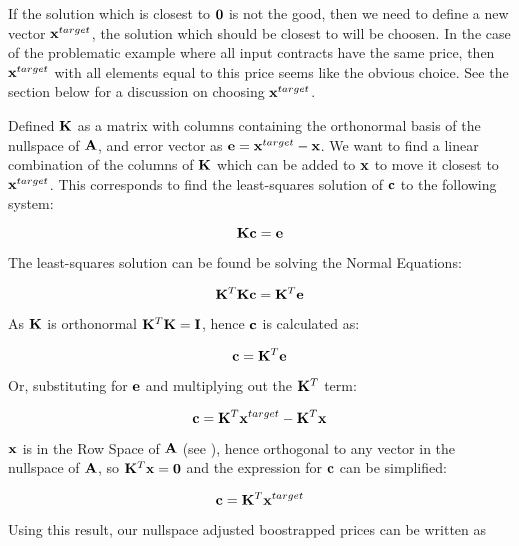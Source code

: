 \documentclass{article}
\begin{document}
\bigskip

If the solution which is closest to $\mathbf{0}$ is not the good, then we need to define
a new vector $\mathbf{x}^{target}$, the solution which should be closest to will be choosen.
In the case of the problematic example where all input contracts have the same price,
then $\mathbf{x}^{target}$ with all elements equal to this price seems like the obvious choice.
See the section below for a discussion on choosing $\mathbf{x}^{target}$.

\bigskip

Defined $\mathbf{K}$ as a matrix with columns containing the orthonormal basis of the nullspace
of $\mathbf{A}$, and error vector as $\mathbf{e} = \mathbf{x}^{target} - \mathbf{x}$. We want to find a linear combination
of the columns of $\mathbf{K}$ which can be added to $\mathbf{x}$ to move it closest to $\mathbf{x}^{target}$.
This corresponds to find the least-squares solution of $\mathbf{c}$ to the following system:

\begin{equation}
    \mathbf{K}\mathbf{c} = \mathbf{e}
\end{equation}

The least-squares solution can be found be solving the Normal Equations:

\begin{equation}
    \mathbf{K}^T \mathbf{K} \mathbf{c} = \mathbf{K}^T \mathbf{e}
\end{equation}

As $\mathbf{K}$ is orthonormal $\mathbf{K}^T \mathbf{K} = \mathbf{I}$, hence $\mathbf{c}$ is calculated as:

\begin{equation}
    \mathbf{c} = \mathbf{K}^T \mathbf{e}
\end{equation}

Or, substituting for $\mathbf{e}$ and multiplying out the $\mathbf{K}^T$ term:

\begin{equation}
    \mathbf{c} = \mathbf{K}^T \mathbf{x}^{target} - \mathbf{K}^T \mathbf{x}
\end{equation}

$\mathbf{x}$ is in the Row Space of $\mathbf{A}$ (see \cite{Strang}), hence orthogonal to 
any vector in the nullspace of $\mathbf{A}$, so $\mathbf{K}^T \mathbf{x} = \mathbf{0}$ and the expression 
for $\mathbf{c}$ can be simplified:

\begin{equation}
    \mathbf{c} = \mathbf{K}^T \mathbf{x}^{target}
\end{equation}



Using this result, our nullspace adjusted boostrapped prices can be written as
\end{document}
